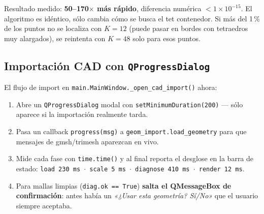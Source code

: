 \documentclass[11pt, a4paper]{article}
\begin{document}
Resultado medido: \textbf{50--170$\times$ más rápido}, diferencia
numérica $< 1\times 10^{-15}$. El algoritmo es idéntico, sólo cambia
cómo se busca el tet contenedor. Si más del 1\,\% de los puntos no
se localiza con $K=12$ (puede pasar en bordes con tetraedros muy
alargados), se reintenta con $K=48$ solo para esos puntos.

\subsection*{Importación CAD con \texttt{QProgressDialog}}

El flujo de import en \texttt{main.MainWindow.\_open\_cad\_import()}
ahora:

\begin{enumerate}
  \item Abre un \texttt{QProgressDialog} modal con
        \texttt{setMinimumDuration(200)} --- sólo aparece si la
        importación realmente tarda.
  \item Pasa un callback \texttt{progress(msg)} a
        \texttt{geom\_import.load\_geometry} para que mensajes de
        gmsh/trimesh aparezcan en vivo.
  \item Mide cada fase con \texttt{time.time()} y al final reporta
        el desglose en la barra de estado:
        \texttt{load 230 ms $\cdot$ scale 5 ms $\cdot$ diagnose 410 ms $\cdot$ render 12 ms}.
  \item Para mallas limpias (\texttt{diag.ok == True})
        \textbf{salta el QMessageBox de confirmación}: antes había un
        \emph{«¿Usar esta geometría? Sí/No»} que el usuario siempre
        aceptaba.
\end{enumerate}

\vfill
\end{document}
